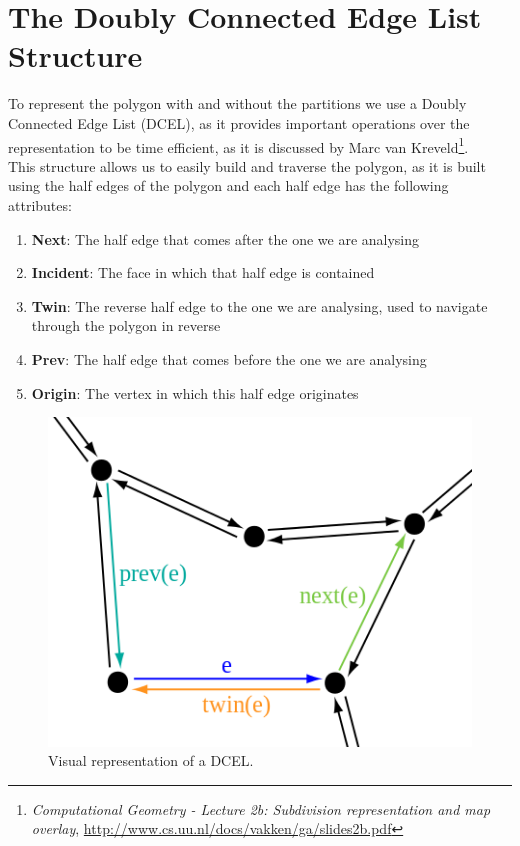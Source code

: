\documentclass[12pt,a4paper,oneside]{article}
\begin{document}
\section{The Doubly Connected Edge List Structure}\label{sec:dcel}
To represent the polygon with and without the partitions we use a Doubly Connected Edge List (DCEL), as it provides important operations over the representation to be time efficient, as it is discussed by Marc van Kreveld\footnote{\textit{Computational Geometry -
Lecture 2b: Subdivision representation and map overlay}, \url{http://www.cs.uu.nl/docs/vakken/ga/slides2b.pdf}}.\\
This structure allows us to easily build and traverse the polygon, as it is built using the half edges of the polygon and each half edge has the following attributes:

\begin{enumerate}  
\item \textbf{Next}: The half edge that comes after the one we are analysing
\item \textbf{Incident}: The face in which that half edge is contained
\item \textbf{Twin}: The reverse half edge to the one we are analysing, used to navigate through the polygon in reverse
\item \textbf{Prev}: The half edge that comes before the one we are analysing
\item \textbf{Origin}: The vertex in which this half edge originates
\end{enumerate}

\begin{figure}[h!]
  \centering \includegraphics[scale=0.5]{dcel.png}
  \caption{Visual representation of a DCEL.}
  \label{fig:Dcel}
\end{figure}
\end{document}
